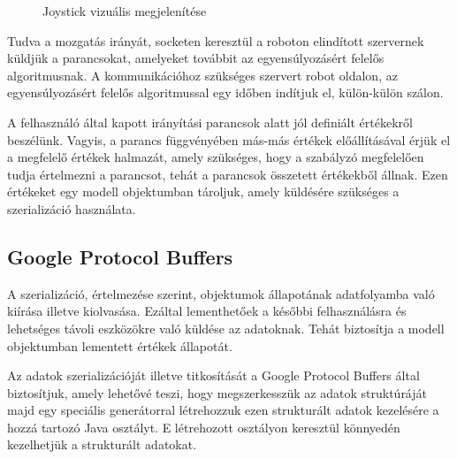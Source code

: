 \begin{figure}[!htb]
	\centering
	\caption{Joystick vizuális megjelenítése}
	\label{fig:joystick}
\end{figure}

Tudva a mozgatás irányát, socketen keresztül a roboton elindított szervernek küldjük a parancsokat, amelyeket továbbit az egyensúlyozásért felelős algoritmusnak. A kommunikációhoz szükséges szervert robot oldalon, az egyensúlyozásért felelős algoritmussal egy időben indítjuk el, külön-külön szálon.

A felhasználó által kapott irányítási parancsok alatt jól definiált értékekről beszélünk. Vagyis, a parancs függvényében más-más értékek előállításával érjük el a megfelelő értékek halmazát, amely szükséges, hogy a szabályzó megfelelően tudja értelmezni a parancsot, tehát a parancsok összetett értékekből állnak. Ezen értékeket egy modell objektumban tároljuk, amely küldésére szükséges a szerializáció használata.

\subsection{Google Protocol Buffers}

A szerializáció, értelmezése szerint, objektumok állapotának adatfolyamba való kiírása illetve kiolvasása. Ezáltal lementhetőek a későbbi felhasználásra és lehetséges távoli eszközökre való küldése az adatoknak. Tehát biztosítja a modell objektumban lementett értékek állapotát.

Az adatok szerializációját illetve titkosítását a Google Protocol Buffers által biztosítjuk, amely lehetővé teszi, hogy megszerkesszük az adatok struktúráját majd egy speciális generátorral létrehozzuk ezen strukturált adatok kezelésére a hozzá tartozó Java osztályt. E létrehozott osztályon keresztül könnyedén kezelhetjük a strukturált adatokat.

